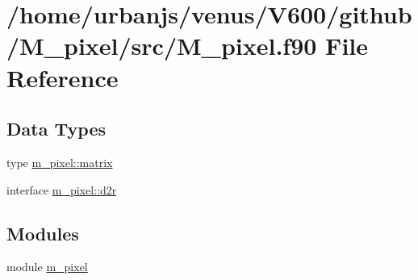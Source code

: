 \hypertarget{M__pixel_8f90}{}\section{/home/urbanjs/venus/\+V600/github/\+M\+\_\+pixel/src/\+M\+\_\+pixel.f90 File Reference}
\label{M__pixel_8f90}
\subsection*{Data Types}
\begin{DoxyCompactItemize}
\item 
type \mbox{\hyperlink{structm__pixel_1_1matrix}{m\+\_\+pixel\+::matrix}}
\item 
interface \mbox{\hyperlink{interfacem__pixel_1_1d2r}{m\+\_\+pixel\+::d2r}}
\end{DoxyCompactItemize}
\subsection*{Modules}
\begin{DoxyCompactItemize}
\item 
module \mbox{\hyperlink{namespacem__pixel}{m\+\_\+pixel}}
\end{DoxyCompactItemize}
